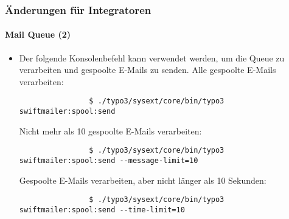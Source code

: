 \begin{frame}[fragile]
	\frametitle{Änderungen für Integratoren}
	\framesubtitle{Mail Queue (2)}

	\lstset{basicstyle=\tiny\ttfamily}

	\begin{itemize}
		\item Der folgende Konsolenbefehl kann verwendet werden, um die Queue zu verarbeiten und 
			gespoolte E-Mails zu senden.
			\newline\newline
			\small
				Alle gespoolte E-Mails verarbeiten:
			\normalsize
			\begin{lstlisting}
				$ ./typo3/sysext/core/bin/typo3 swiftmailer:spool:send
			\end{lstlisting}

			\small
				Nicht mehr als 10 gespoolte E-Mails verarbeiten:
			\normalsize
			\begin{lstlisting}
				$ ./typo3/sysext/core/bin/typo3 swiftmailer:spool:send --message-limit=10
			\end{lstlisting}

			\small
				Gespoolte E-Mails verarbeiten, aber nicht länger als 10 Sekunden:
			\normalsize
			\begin{lstlisting}
				$ ./typo3/sysext/core/bin/typo3 swiftmailer:spool:send --time-limit=10
			\end{lstlisting}

	\end{itemize}

\end{frame}


